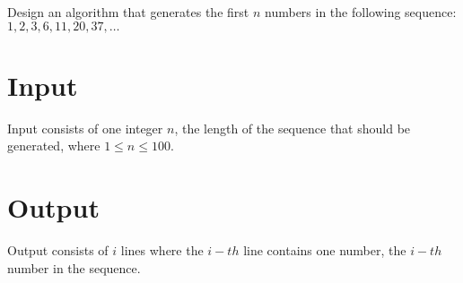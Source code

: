 
Design an algorithm that generates the first $n$ numbers in the following sequence: $1, 2, 3, 6, 11, 20, 37, \dots$

\section*{Input}
Input consists of one integer $n$, the length of the sequence that should be generated, where $1 \leq n \leq 100$.

\section*{Output}
Output consists of $i$ lines where the $i-th$ line contains one number, the $i-th$ number in the sequence.
